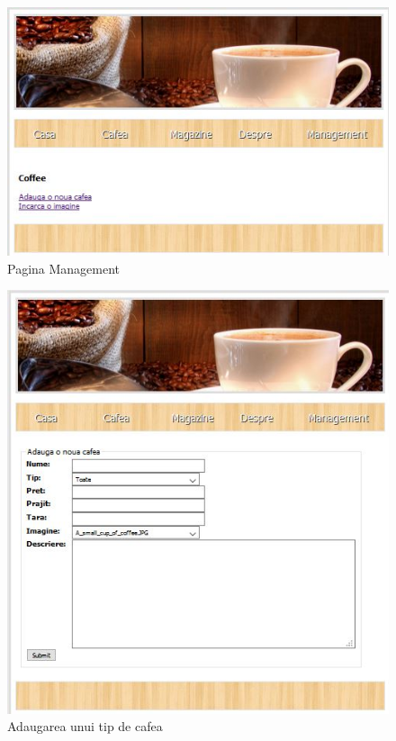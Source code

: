 \begin{figure}[!ht]
	
	\centering
	
	\includegraphics[width=1.0\textwidth]{Cattura4.JPG}
	
	\caption{Pagina Management}
	
	\label{Im_label}
	
\end{figure}


\begin{figure}[!ht]
	
	\centering
	
	\includegraphics[width=1.0\textwidth]{Cattura5.JPG}
	
	\caption{Adaugarea unui tip de cafea}
	
	\label{Im_label}
	
\end{figure}

